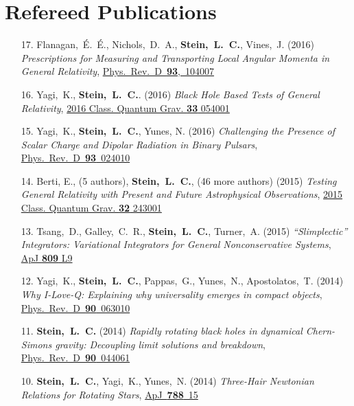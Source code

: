 \section{\sc Refereed Publications}
\begin{enumerate}
\item[{17.}]
  Flanagan,~\'E.~\'E., Nichols,~D.~A., {\bf Stein,~L.~C.}, Vines,~J.
  (2016)
  {\it Prescriptions for Measuring and Transporting Local Angular Momenta in General Relativity},
  \href{http://dx.doi.org/10.1103/PhysRevD.93.104007}{Phys.~Rev.~D~{\bf 93},~104007}
\item[{16.}] Yagi,~K., {\bf Stein,~L.~C.}. (2016)
  {\it Black Hole Based Tests of General Relativity},
  \href{http://dx.doi.org/10.1088/0264-9381/33/5/054001}{2016 Class. Quantum Grav. {\bf 33} 054001}
\item[{15.}] Yagi,~K., {\bf Stein,~L.~C.}, Yunes, N. (2016)
  {\it Challenging the Presence of Scalar Charge and Dipolar Radiation in Binary Pulsars},
  \href{http://dx.doi.org/doi:10.1103/PhysRevD.93.024010}{Phys.~Rev.~D~{\bf 93}~024010}
\item[{14.}] Berti, E., (5 authors), {\bf Stein,~L.~C.}, (46 more authors) (2015)
  {\it Testing General Relativity with Present and Future
    Astrophysical Observations},
  \href{http://dx.doi.org/10.1088/0264-9381/32/24/243001}{2015 Class. Quantum Grav. {\bf 32} 243001}
\item[{13.}] Tsang,~D., Galley,~C.~R., {\bf Stein,~L.~C.}, Turner,~A. (2015)
  {\it ``Slimplectic'' Integrators: Variational Integrators for General Nonconservative Systems},
  \href{http://dx.doi.org/10.1088/2041-8205/809/1/L9}{ApJ {\bf 809} L9}
\item[{12.}] Yagi,~K., {\bf Stein,~L.~C.}, Pappas,~G., Yunes,~N., Apostolatos,~T. (2014)
  {\it Why I-Love-Q: Explaining why universality emerges in compact objects},
  \href{http://dx.doi.org/10.1103/PhysRevD.90.063010}{Phys.~Rev.~D~{\bf 90}~063010}
\item[{11.}] {\bf Stein,~L.~C.} (2014)
  {\it Rapidly rotating black holes in dynamical Chern-Simons gravity:
    Decoupling limit solutions and breakdown},
  \href{http://dx.doi.org/10.1103/PhysRevD.90.044061}{Phys.~Rev.~D~{\bf 90}~044061}
\item[{10.}] {\bf Stein,~L.~C.}, Yagi,~K., Yunes,~N. (2014)
  {\it Three-Hair Newtonian Relations for Rotating Stars},
  \href{http://dx.doi.org/10.1088/0004-637X/788/1/15}{ApJ~{\bf 788}~15}

\end{enumerate}
